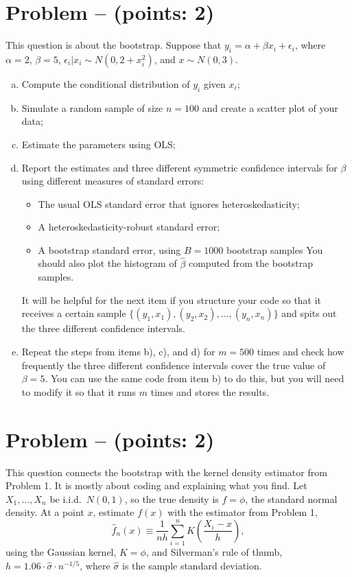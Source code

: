 \documentclass[11pt]{article}
\theoremstyle{definition}
\newcounter{problem}
\renewcommand{\theproblem}{\arabic{problem}}
\newcommand{\problem}[1]{
	\stepcounter{problem}
	\section*{Problem \theproblem{} -- (points: #1)}
}
\begin{document}
\problem{2}
This question is about the bootstrap. Suppose that $y_i = \alpha + \beta x_i + \epsilon_i$, where $\alpha = 2$, $\beta = 5$, $\epsilon_i|x_i \sim N(0, 2 + x_i^2)$, and $x \sim N(0, 3)$.
\begin{enumerate}[a)]
	\item Compute the conditional distribution of $y_i$ given $x_i$;
	\item Simulate a random sample of size $n = 100$ and create a scatter plot of your data;
	\item Estimate the parameters using OLS;
	\item Report the estimates and three different symmetric confidence intervals for $\beta$ using different measures of standard errors:
	\begin{itemize}
		\item The usual OLS standard error that ignores heteroskedasticity;
		\item A heteroskedasticity-robust standard error;
		\item A bootstrap standard error, using $B = 1000$ bootstrap samples
	You should also plot the histogram of $\hat{\beta}$ computed from the bootstrap samples.
	\end{itemize}

	It will be helpful for the next item if you structure your code so that it receives a certain sample $\{(y_1, x_1), (y_2, x_2), ..., (y_n, x_n)\}$ and spits out the three different confidence intervals.

	\item Repeat the steps from items b), c), and d) for $m = 500$ times and check how frequently the three different confidence intervals cover the true value of $\beta = 5$. You can use the same code from item b) to do this, but you will need to modify it so that it runs $m$ times and stores the results.
\end{enumerate}

\problem{2}
This question connects the bootstrap with the kernel density estimator from Problem 1. It is mostly about coding and explaining what you find. Let $X_1, \dots, X_n$ be i.i.d.\ $N(0, 1)$, so the true density is $f = \phi$, the standard normal density. At a point $x$, estimate $f(x)$ with the estimator from Problem 1,
\[
\hat{f}_n(x) \equiv \frac{1}{nh} \sum_{i=1}^n K\left(\frac{X_i - x}{h}\right),
\]
using the Gaussian kernel, $K = \phi$, and Silverman's rule of thumb, $h = 1.06 \cdot \hat{\sigma} \cdot n^{-1/5}$, where $\hat{\sigma}$ is the sample standard deviation.
\end{document}
